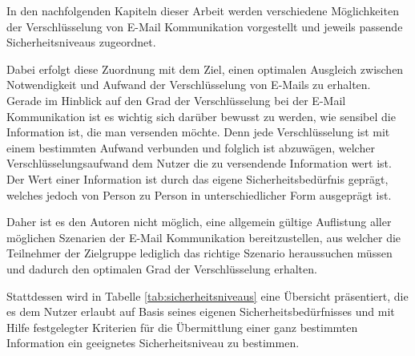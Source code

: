 \documentclass  [paper=a4,
				fontsize=12pt,
				listof=totoc,
				bibliography=totoc
				]{scrreprt}
\begin{document}
	
		In den nachfolgenden Kapiteln dieser Arbeit werden verschiedene Möglichkeiten der Verschlüsselung von E-Mail Kommunikation vorgestellt und jeweils passende Sicherheitsniveaus zugeordnet. %
		
		Dabei erfolgt diese Zuordnung mit dem Ziel, einen optimalen Ausgleich zwischen Notwendigkeit und Aufwand der Verschlüsselung von E-Mails zu erhalten.
		\medskip\\
		
	
	
		
		Gerade im Hinblick auf den Grad der Verschlüsselung bei der E-Mail Kommunikation ist es wichtig sich darüber bewusst zu werden, wie sensibel die Information ist, die man versenden möchte. Denn jede Verschlüsselung ist mit einem bestimmten Aufwand verbunden und folglich ist abzuwägen, welcher Verschlüsselungsaufwand dem Nutzer die zu versendende Information wert ist. 
		\medskip\\
		
	
	
		Der Wert einer Information ist durch das eigene Sicherheitsbedürfnis geprägt, welches jedoch von Person zu Person in unterschiedlicher Form ausgeprägt ist.
		
		Daher ist es den Autoren nicht möglich, eine allgemein gültige Auflistung aller möglichen Szenarien der E-Mail Kommunikation bereitzustellen, aus welcher die Teilnehmer der Zielgruppe lediglich das richtige Szenario heraussuchen müssen und dadurch den optimalen Grad der Verschlüsselung erhalten. 
		
		Stattdessen wird in Tabelle \ref{tab:sicherheitsniveaus} eine Übersicht präsentiert, die es dem Nutzer erlaubt auf Basis seines eigenen Sicherheitsbedürfnisses und mit Hilfe festgelegter Kriterien für die Übermittlung einer ganz bestimmten Information ein geeignetes Sicherheitsniveau zu bestimmen. 
		\medskip\\
		
\end{document}
